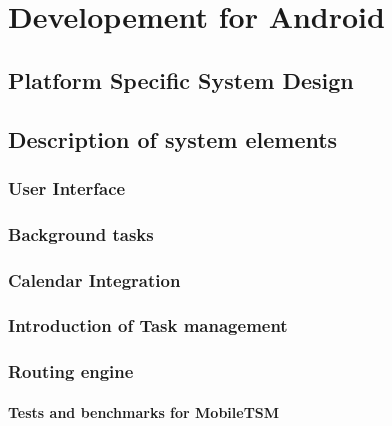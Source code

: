\documentclass[11pt,a4paper]{scrreprt}
\begin{document}

\chapter{Developement for Android} %
\label{chp:android}
%

	\section{Platform Specific System Design} %
	\label{sec:android_desing}
	
	
	\section{Description of system elements} %
	
	\subsection{User Interface} %
	\label{sec:user_interface}
	
	
	\subsection{Background tasks} %
	\label{sec:android_integration}
	
	
	\subsection{Calendar Integration} %
	\label{sec:android_calendar}
	
	
	\subsection{Introduction of Task management} %
	\label{sec:android_task}
	
	
	\subsection{Routing engine} %
	\label{sub:routing_mobiletsm}
	

	\subsubsection{Tests and benchmarks for MobileTSM}
	\label{sub:routing_testcase}
	
	
\end{document}
